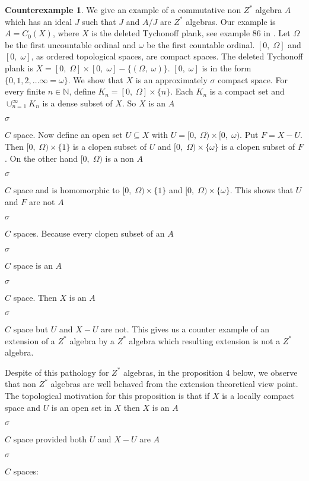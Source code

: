 \documentclass[a4paper,10pt]{amsart}
\theoremstyle{definition}
\newtheorem*{exa}{Counterexample }
\theoremstyle{plain}
\begin{document}
 \begin{exa}
We give  an example  of a commutative non $Z^{*}$  algebra $A$  which  has an ideal $J$  such that $J$  and $A/J$ are  $Z^{*}$  algebras. Our example is $A=C_{0}(X)$, where $X$ is   the deleted Tychonoff plank, see example 86 in  \cite{COUNTER}. Let $\Omega$  be the first uncountable ordinal  and $\omega$  be the first countable  ordinal. $[0,\;\Omega]$ and $[0,\;\omega]$, as ordered topological spaces,  are compact  spaces. The  deleted Tychonoff plank is $X=[0,\;\Omega]\times [0,\;\omega]-\{(\Omega,\;\omega)\}$. $[0,\;\omega]$ is in the  form $\{0,1,2,\ldots \infty=\omega \}$. We  show that $X$ is  an approximately  $\sigma$ compact  space. For every finite $n\in \mathbb{N}$, define  $K_{n}=[0,\;\Omega]\times \{n\}$. Each $K_{n}$ is  a compact set and $\cup_{n=1}^{\infty} K_{n}$ is  a dense subset of $X$. So $X$ is an $A$\begin{Large}${\sigma}$\end{Large}$C$  space.
Now define an open set $U\subseteq X$  with $U=[0,\;\Omega)\times [0,\;\omega)$. Put $F=X-U$. Then
$[0,\;\Omega) \times \{1\}$ is  a clopen subset of $U$ and $[0,\; \Omega)\times \{ \omega \}$ is  a clopen subset of $F$. On the other hand $[0,\; \Omega)$ is a  non   $A$\begin{Large}${\sigma}$\end{Large}$C$  space and is homomorphic to $[0,\;\Omega) \times \{1\}$ and
$[0,\; \Omega)\times \{ \omega \}$. This  shows that $U$ and $F$ are not $A$\begin{Large}${\sigma}$\end{Large}$C$ spaces. Because every clopen subset of an $A$\begin{Large}${\sigma}$\end{Large}$C$ space is an $A$\begin{Large}${\sigma}$\end{Large}$C$ space. Then $X$  is  an $A$\begin{Large}${\sigma}$\end{Large}$C$ space but $U$  and $X-U$ are not. This  gives us  a  counter example  of   an extension of  a $Z^{*}$  algebra  by  a $Z^{*}$ algebra which resulting extension is not  a $Z^{*}$ algebra.
 \end{exa}
 Despite of this pathology for  $Z^{*}$  algebras, in the  proposition 4 below, we observe that non $Z^{*}$ algebras are well behaved from the extension theoretical  view point. The topological motivation for this  proposition is that if $X$ is  a  locally  compact  space  and $U$ is  an open set in $X$ then $X$ is  an $A$\begin{Large}${\sigma}$\end{Large}$C$   space  provided both $U$  and $X-U$  are $A$\begin{Large}${\sigma}$\end{Large}$C$  spaces:
\end{document}
